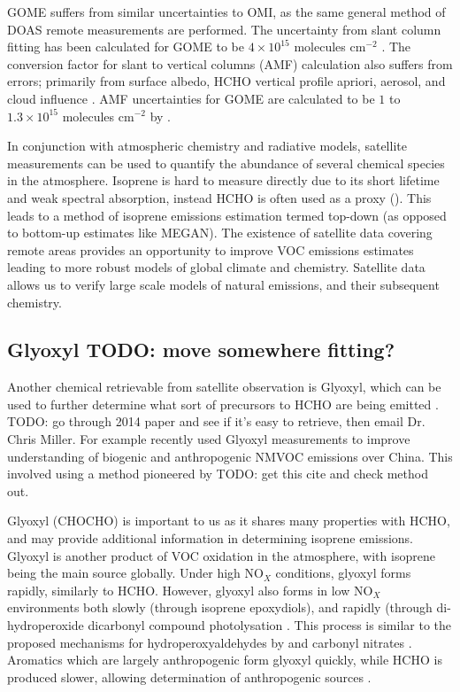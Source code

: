     GOME suffers from similar uncertainties to OMI, as the same general method of DOAS remote measurements are performed.
    The uncertainty from slant column fitting has been calculated for GOME to be $4\times10^{15}$ molecules cm$^{-2}$ \citep{Chance2000, Millet2006}. 
    The conversion factor for slant to vertical columns (AMF) calculation also suffers from errors; primarily from surface albedo, HCHO vertical profile apriori, aerosol, and cloud influence \citep{Millet2006}. 
    AMF uncertainties for GOME are calculated to be $1$ to $1.3\times10^{15}$ molecules cm$^{-2}$ by \cite{Shim2005}.
    
    In conjunction with atmospheric chemistry and radiative models, satellite measurements can be used to quantify the abundance of several chemical species in the atmosphere.
    Isoprene is hard to measure directly due to its short lifetime and weak spectral absorption, instead HCHO is often used as a proxy (\cite{Millet2006, Fu2007, Dufour2009, Marais2012, bauwens2013satellite, Kefauver2014, Bauwens2016}).
    This leads to a method of isoprene emissions estimation termed top-down (as opposed to bottom-up estimates like MEGAN).
    The existence of satellite data covering remote areas provides an opportunity to improve VOC emissions estimates leading to more robust models of global climate and chemistry. 
    Satellite data allows us to verify large scale models of natural emissions, and their subsequent chemistry.
  
  \subsection{Glyoxyl TODO: move somewhere fitting?}
  
    Another chemical retrievable from satellite observation is Glyoxyl, which can be used to further determine what sort of precursors to HCHO are being emitted \citep{Stavrakou2009, Miller2014, Miller2017}.
    TODO: go through 2014 paper and see if it's easy to retrieve, then email Dr. Chris Miller.
    For example \cite{Cao2018_discuss} recently used Glyoxyl measurements to improve understanding of biogenic and anthropogenic NMVOC emissions over China.
    This involved using a method pioneered by \cite{Stavrakou2009} TODO: get this cite and check method out.
    
    Glyoxyl (CHOCHO) is important to us as it shares many properties with HCHO, and may provide additional information in determining isoprene emissions.
    Glyoxyl is another product of VOC oxidation in the atmosphere, with isoprene being the main source globally.
    Under high NO$_X$ conditions, glyoxyl forms rapidly, similarly to HCHO.
    However, glyoxyl also forms in low NO$_X$ environments both slowly (through isoprene epoxydiols), and rapidly (through di-hydroperoxide dicarbonyl compound photolysation \citep{Crounse2013}.
    This process is similar to the proposed mechanisms for hydroperoxyaldehydes by \cite{Peeters2014} and carbonyl nitrates \citep{Muller2014}.
    Aromatics which are largely anthropogenic form glyoxyl quickly, while HCHO is produced slower, allowing determination of anthropogenic sources \citep{Cao2018_discuss}.
    
